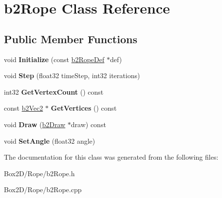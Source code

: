 \hypertarget{classb2_rope}{}\section{b2\+Rope Class Reference}
\label{classb2_rope}
\subsection*{Public Member Functions}
\begin{DoxyCompactItemize}
\item 
\mbox{\label{classb2_rope_a2a672ca3310790f4af1beb123e597d70}} 
void {\bfseries Initialize} (const \hyperlink{structb2_rope_def}{b2\+Rope\+Def} $\ast$def)
\item 
\mbox{\label{classb2_rope_abe9ce398cef717b136645cbc37f38d70}} 
void {\bfseries Step} (float32 time\+Step, int32 iterations)
\item 
\mbox{\label{classb2_rope_afdf6f7234dbf73fa83a058452e3d492a}} 
int32 {\bfseries Get\+Vertex\+Count} () const
\item 
\mbox{\label{classb2_rope_acf2b433c741b90b3668ff4477b4a8319}} 
const \hyperlink{structb2_vec2}{b2\+Vec2} $\ast$ {\bfseries Get\+Vertices} () const
\item 
\mbox{\label{classb2_rope_a9545f16b4ed203890a290d58ba56255c}} 
void {\bfseries Draw} (\hyperlink{classb2_draw}{b2\+Draw} $\ast$draw) const
\item 
\mbox{\label{classb2_rope_a8a1717a5e0b2c54d56fe438c8cae43b7}} 
void {\bfseries Set\+Angle} (float32 angle)
\end{DoxyCompactItemize}


The documentation for this class was generated from the following files\+:\begin{DoxyCompactItemize}
\item 
Box2\+D/\+Rope/b2\+Rope.\+h\item 
Box2\+D/\+Rope/b2\+Rope.\+cpp\end{DoxyCompactItemize}
